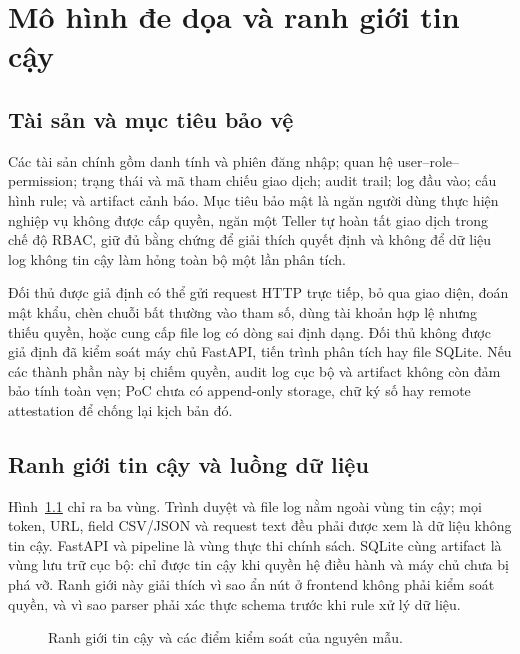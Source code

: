 \chapter{Mô hình đe dọa và ranh giới tin cậy}
\label{chap:threat-model}

\section{Tài sản và mục tiêu bảo vệ}

Các tài sản chính gồm danh tính và phiên đăng nhập; quan hệ user--role--permission;
trạng thái và mã tham chiếu giao dịch; audit trail; log đầu vào; cấu hình rule;
và artifact cảnh báo. Mục tiêu bảo mật là ngăn người dùng thực hiện nghiệp vụ
không được cấp quyền, ngăn một Teller tự hoàn tất giao dịch trong chế độ RBAC,
giữ đủ bằng chứng để giải thích quyết định và không để dữ liệu log không tin
cậy làm hỏng toàn bộ một lần phân tích.

Đối thủ được giả định có thể gửi request HTTP trực tiếp, bỏ qua giao diện,
đoán mật khẩu, chèn chuỗi bất thường vào tham số, dùng tài khoản hợp lệ nhưng
thiếu quyền, hoặc cung cấp file log có dòng sai định dạng. Đối thủ không được
giả định đã kiểm soát máy chủ FastAPI, tiến trình phân tích hay file SQLite.
Nếu các thành phần này bị chiếm quyền, audit log cục bộ và artifact không còn
đảm bảo tính toàn vẹn; PoC chưa có append-only storage, chữ ký số hay remote
attestation để chống lại kịch bản đó.

\section{Ranh giới tin cậy và luồng dữ liệu}

Hình~\ref{fig:trust-boundaries} chỉ ra ba vùng. Trình duyệt và file log nằm
ngoài vùng tin cậy; mọi token, URL, field CSV/JSON và request text đều phải
được xem là dữ liệu không tin cậy. FastAPI và pipeline là vùng thực thi chính
sách. SQLite cùng artifact là vùng lưu trữ cục bộ: chỉ được tin cậy khi quyền
hệ điều hành và máy chủ chưa bị phá vỡ. Ranh giới này giải thích vì sao ẩn nút
ở frontend không phải kiểm soát quyền, và vì sao parser phải xác thực schema
trước khi rule xử lý dữ liệu.

\begin{figure}[htbp]
\centering
\resizebox{\textwidth}{!}{}
\caption{Ranh giới tin cậy và các điểm kiểm soát của nguyên mẫu.}
\label{fig:trust-boundaries}
\end{figure}

